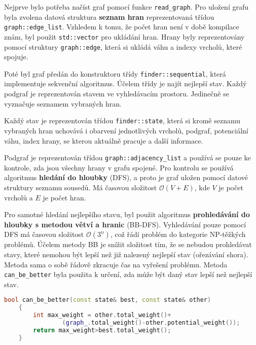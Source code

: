 Nejprve bylo potřeba načíst graf pomocí funkce \texttt{read\_graph}.
Pro uložení grafu byla zvolena datová struktura \textbf{seznam hran} reprezentovaná třídou \texttt{graph::edge\_list}.
Vzhledem k tomu, že počet hran není v době kompilace znám, byl použit \texttt{std::vector} pro ukládání hran.
Hrany byly reprezentovány pomocí struktury \texttt{graph::edge}, která si ukládá váhu a indexy vrcholů, které spojuje.

Poté byl graf předán do konstruktoru třídy \texttt{finder::sequential}, která implementuje sekvenční algoritmus.
Účelem třídy je najít nejlepší stav.
Každý podgraf je reprezentován stavem ve vyhledávacím prostoru.
Jedinečně se vyznačuje seznamem vybraných hran.

Každý stav je reprezentován třídou \texttt{finder::state}, která si kromě seznamu vybraných hran uchovává i obarvení jednotlivých vrcholů, podgraf, potenciální váhu, index hrany, se kterou aktuálně pracuje a další informace.

Podgraf je reprezentován třídou \texttt{graph::adjacency\_list} a používá se pouze ke kontrole, zda jsou všechny hrany v grafu spojené.
Pro kontrolu se používá algoritmus \textbf{hledání do hloubky} (DFS), a proto je graf uložen pomocí datové struktury seznamu sousedů.
Má časovou složitost \(\mathcal{O}(V+E)\), kde \(V\) je počet vrcholů a \(E\) je počet hran.

Pro samotné hledání nejlepšího stavu, byl použit algoritmus \textbf{prohledávání do hloubky s metodou větví a hranic} (BB-DFS).
Vyhledávání pouze pomocí DFS má časovou složitost \(\mathcal{O}(3^n)\), což řádí problém do kategorie NP-těžkých problémů.
Účelem metody BB je snížit složitost tím, že se nebudou prohledávat stavy, které nemohou být lepší než již nalezený nejlepší stav (ořezávání shora).
Metoda sama o sobě řádově zkracuje čas na vyřešení problému.
Metoda \texttt{can\_be\_better} byla použita k určení, zda může být daný stav lepší než nejlepší stav.

\begin{lstlisting}[language=C++, label={lst:can_be_better}, title={Metoda pro ořezávání shora}]
    bool can_be_better(const state& best, const state& other)
    {
        int max_weight = other.total_weight()+
                (graph_.total_weight()-other.potential_weight());
        return max_weight>best.total_weight();
    }
\end{lstlisting}




